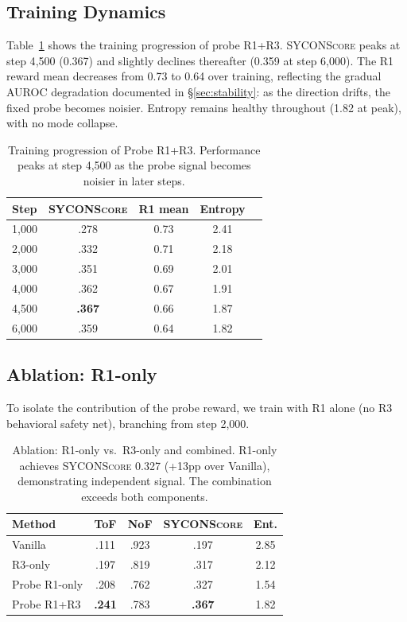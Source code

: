 \documentclass[11pt,a4paper]{article}
\newcommand{\sycon}{\textsc{SYCONScore}}
\begin{document}
\subsection{Training Dynamics}

Table~\ref{tab:progression} shows the training progression of probe R1+R3. \sycon{} peaks at step 4{,}500 (0.367) and slightly declines thereafter (0.359 at step 6{,}000). The R1 reward mean decreases from 0.73 to 0.64 over training, reflecting the gradual AUROC degradation documented in \S\ref{sec:stability}: as the direction drifts, the fixed probe becomes noisier. Entropy remains healthy throughout (1.82 at peak), with no mode collapse.

\begin{table}[t]
\centering
\small
\begin{tabular}{@{}lcccc@{}}
\toprule
Step & \sycon{} & R1 mean & Entropy \\
\midrule
1{,}000 & .278 & 0.73 & 2.41 \\
2{,}000 & .332 & 0.71 & 2.18 \\
3{,}000 & .351 & 0.69 & 2.01 \\
4{,}000 & .362 & 0.67 & 1.91 \\
4{,}500 & \textbf{.367} & 0.66 & 1.87 \\
6{,}000 & .359 & 0.64 & 1.82 \\
\bottomrule
\end{tabular}
\caption{Training progression of Probe R1+R3. Performance peaks at step 4{,}500 as the probe signal becomes noisier in later steps.}
\label{tab:progression}
\end{table}


\subsection{Ablation: R1-only}

To isolate the contribution of the probe reward, we train with R1 alone (no R3 behavioral safety net), branching from step 2{,}000.

\begin{table}[t]
\centering
\small
\begin{tabular}{@{}lcccc@{}}
\toprule
Method & ToF & NoF & \sycon{} & Ent. \\
\midrule
Vanilla & .111 & .923 & .197 & 2.85 \\
R3-only & .197 & .819 & .317 & 2.12 \\
Probe R1-only & .208 & .762 & .327 & 1.54 \\
Probe R1+R3 & \textbf{.241} & .783 & \textbf{.367} & 1.82 \\
\bottomrule
\end{tabular}
\caption{Ablation: R1-only vs.\ R3-only and combined. R1-only achieves \sycon{} 0.327 (+13pp over Vanilla), demonstrating independent signal. The combination exceeds both components.}
\label{tab:ablation}
\end{table}
\end{document}
